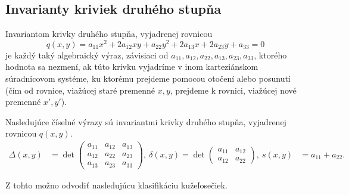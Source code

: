 \subsection{Invarianty kriviek druhého stupňa}
\begin{definition}
Invariantom krivky druhého stupňa, vyjadrenej rovnicou
$$
q(x, y) = a_{11}x^2 + 2a_{12}xy + a_{22}y^2 + 2a_{13}x + 2a_{23}y + a_{33} = 0
$$
je každý taký algebraický výraz, závisiaci od \(a_{11}, a_{12}, a_{22}, a_{13}, a_{23}, a_{33}\), ktorého hodnota sa nezmení, ak túto krivku vyjadríme v inom karteziánskom súradnicovom systéme, ku ktorému prejdeme pomocou otočení alebo posunutí (čím od rovnice, viažúcej staré premenné \(x, y\), prejdeme k rovnici, viažúcej nové premenné \(x', y'\)).
\end{definition}

\begin{theorem}
Nasledujúce číselné výrazy sú invariantmi krivky druhého stupňa, vyjadrenej rovnicou $q(x, y)$.
\begin{align*}
\Delta(x,y) &= \det \begin{pmatrix} 
a_{11} & a_{12} & a_{13} \\ 
a_{12} & a_{22} & a_{23} \\
a_{13} & a_{23} & a_{33} \end{pmatrix}, \
\delta(x,y) = \det \begin{pmatrix} a_{11} & a_{12} \\ a_{12} & a_{22} \end{pmatrix}, \
s(x,y) &= a_{11} + a_{22}.
\end{align*}
\end{theorem}
Z tohto možno odvodiť nasledujúcu klasifikáciu kužeľosečiek.


